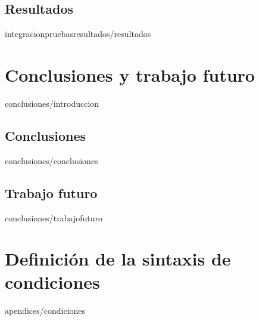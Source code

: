 \documentclass[epsbased,copyright,final,printable,covers,extendedindex,firstnumbered,tfg,gnuplot]{tfgtfmthesisuam}
\begin{document}
	\section{Resultados\label{SEC:RESULTADOS}}{integracionpruebasresultados/resultados}

\chapter{Conclusiones y trabajo futuro\label{CAP:CONCLUSIONES}}{conclusiones/introduccion}
	\section{Conclusiones\label{SEC:CONCLUSIONES}}{conclusiones/conclusiones}
	\section{Trabajo futuro\label{SEC:TRABAJOFUTURO}}{conclusiones/trabajofuturo}

\appendix

\chapter{Definición de la sintaxis de condiciones\label{CAP:APCONDICIONES}}{apendices/condiciones}
\end{document}
